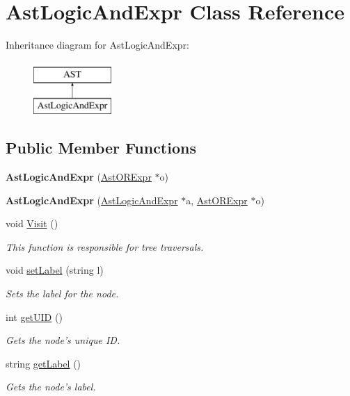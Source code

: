 \hypertarget{classAstLogicAndExpr}{\section{Ast\-Logic\-And\-Expr Class Reference}
\label{classAstLogicAndExpr}
}
Inheritance diagram for Ast\-Logic\-And\-Expr\-:\begin{figure}[H]
\begin{center}
\leavevmode
\includegraphics[height=2.000000cm]{classAstLogicAndExpr}
\end{center}
\end{figure}
\subsection*{Public Member Functions}
\begin{DoxyCompactItemize}
\item 
\hypertarget{classAstLogicAndExpr_a7c71466f3ec88e35ac925d7d69fe5e3b}{{\bfseries Ast\-Logic\-And\-Expr} (\hyperlink{classAstORExpr}{Ast\-O\-R\-Expr} $\ast$o)}\label{classAstLogicAndExpr_a7c71466f3ec88e35ac925d7d69fe5e3b}

\item 
\hypertarget{classAstLogicAndExpr_a522ff78d2ca7bf2a3882ad6872b9f1e4}{{\bfseries Ast\-Logic\-And\-Expr} (\hyperlink{classAstLogicAndExpr}{Ast\-Logic\-And\-Expr} $\ast$a, \hyperlink{classAstORExpr}{Ast\-O\-R\-Expr} $\ast$o)}\label{classAstLogicAndExpr_a522ff78d2ca7bf2a3882ad6872b9f1e4}

\item 
void \hyperlink{classAstLogicAndExpr_a4fc66df5e58e7bea73a712986e94ddcf}{Visit} ()
\begin{DoxyCompactList}\small\item\em This function is responsible for tree traversals. \end{DoxyCompactList}\item 
void \hyperlink{classAST_a71d680856e95ff89f55d5311a552eba6}{set\-Label} (string l)
\begin{DoxyCompactList}\small\item\em Sets the label for the node. \end{DoxyCompactList}\item 
int \hyperlink{classAST_ab7a5b1d9f1c2de0d98deb356f724a42c}{get\-U\-I\-D} ()
\begin{DoxyCompactList}\small\item\em Gets the node's unique I\-D. \end{DoxyCompactList}\item 
string \hyperlink{classAST_aee029be902fffc927d16ccb03eb922ad}{get\-Label} ()
\begin{DoxyCompactList}\small\item\em Gets the node's label. \end{DoxyCompactList}\end{DoxyCompactItemize}
